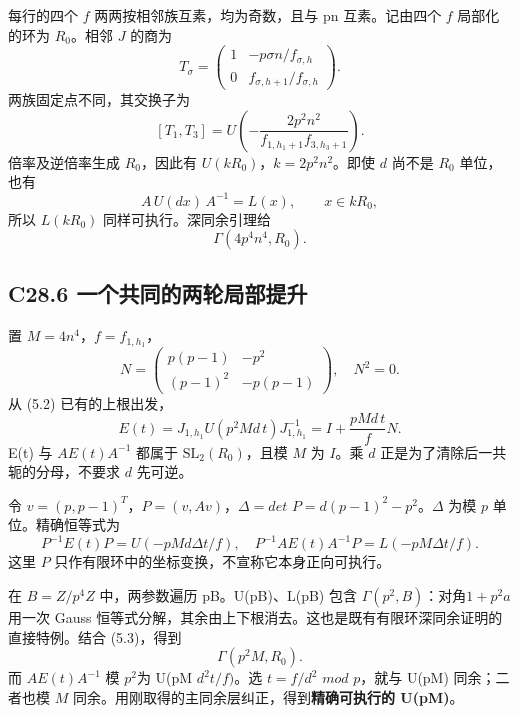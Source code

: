 {每行的四个} {\ensuremath{f}} {两两按相邻族互素，均为奇数，且与} {pn} {互素。记由四个} {\ensuremath{f}} {局部化的环为} {\ensuremath{R_{0}}。相邻} {\ensuremath{J}} {的商为} \[
T_\sigma=
\begin{pmatrix}
1&-p\sigma n/f_{\sigma,h}\\
0&f_{\sigma,h+1}/f_{\sigma,h}
\end{pmatrix}.
\] {两族固定点不同，其交换子为} \[
\boxed{
[T_1,T_3]
=U\left(-\frac{2p^2n^2}{f_{1,h_1+1}f_{3,h_3+1}}\right).
}
\tag{C28.5.2}
\] {倍率及逆倍率生成} {\ensuremath{R_{0}}，因此有} {\ensuremath{U(kR_{0})}，\ensuremath{k=2p^{2}n^{2}}。即使} {\ensuremath{d}} {尚不是} {\ensuremath{R_{0}}} {单位，也有} \[
A\,U(dx)\,A^{-1}=L(x),\qquad x\in kR_0,
\] {所以} {\ensuremath{L(kR_{0})}} {同样可执行。深同余引理给} \[
\Gamma(4p^4n^4,R_0).
\tag{C28.5.3}
\]

\subsection*{\texorpdfstring{{C28.6} {一个共同的两轮局部提升}}{C28.6 一个共同的两轮局部提升}}\label{C28-h179}

{置} {\ensuremath{M=4n^{4}}，\ensuremath{f=f_{1,h_{1}}}，} \[
N=\begin{pmatrix}p(p-1)&-p^2\\(p-1)^2&-p(p-1)\end{pmatrix},
\quad N^2=0.
\] {从} {(5.2)} {已有的上根出发，} \[
E(t)=J_{1,h_1}U(p^2Md\,t)J_{1,h_1}^{-1}
=I+\frac{pMd\,t}{f}N.
\tag{C28.6.1}
\] {E(t)} {与} {\ensuremath{AE(t)A^{-1}}} {都属于} {\ensuremath{\mathrm{SL}_{2}(R_{0})}，且模} {\ensuremath{M}} {为} {\ensuremath{I}。乘} {\ensuremath{d}} {正是为了清除后一共轭的分母，不要求} {\ensuremath{d}} {先可逆。}

{令} {\ensuremath{v=(p,p-1)^T}，\ensuremath{P=(v,Av)}，\ensuremath{\Delta =det}} {\ensuremath{P=d(p-1)^{2}-p^{2}}。\ensuremath{\Delta }} {为模} {\ensuremath{p}} {单位。精确恒等式为} \[
P^{-1}E(t)P=U(-pMd\Delta t/f),\quad
P^{-1}AE(t)A^{-1}P=L(-pM\Delta t/f).
\tag{C28.6.2}
\] {这里} {\ensuremath{P}} {只作有限环中的坐标变换，不宣称它本身正向可执行。}

{在} {\ensuremath{B=Z/p^{4}Z}} {中，两参数遍历} {pB。U(pB)、L(pB)} {包含} {\ensuremath{\Gamma (p^{2},B)}：对角\ensuremath{1+p^{2}a}用一次} {Gauss} {恒等式分解，其余由上下根消去。这也是既有有限环深同余证明的直接特例。结合} {(5.3)，得到} \[
\Gamma(p^2M,R_0).
\] {而} {\ensuremath{AE(t)A^{-1}}} {模} {\ensuremath{p^{2}}为} {U(pM} {\ensuremath{d^{2}t/f)}。选} {\ensuremath{t=f/d^{2}}} {\ensuremath{mod}} {\ensuremath{p}，就与} {U(pM)} {同余；二者也模} {\ensuremath{M}} {同余。用刚取得的主同余层纠正，得到}\textbf{{精确可执行的} {U(pM)}}{。}

